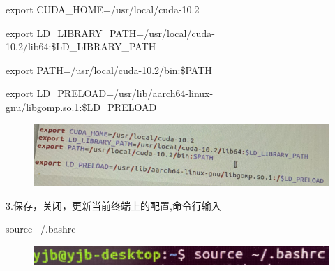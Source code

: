 \documentclass[openbib]{article}
\begin{document}
export CUDA\_HOME=/usr/local/cuda-10.2

export LD\_LIBRARY\_PATH=/usr/local/cuda-10.2/lib64:\$LD\_LIBRARY\_PATH

export PATH=/usr/local/cuda-10.2/bin:\$PATH

export LD\_PRELOAD=/usr/lib/aarch64-linux-gnu/libgomp.so.1:\$LD\_PRELOAD
\begin{figure}[H]
	\centering
	\includegraphics[scale=0.3]{b13}
\end{figure}
3.保存，关闭，更新当前终端上的配置,命令行输入

source ~/.bashrc
\begin{figure}[H]
	\centering
	\includegraphics[scale=0.3]{b14}
\end{figure}
\end{document}
